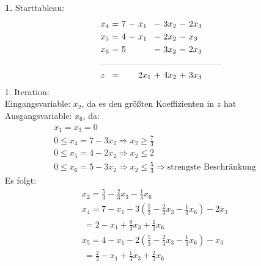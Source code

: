 \documentclass [a4paper,11pt]{article}
\author{\authorinfotitle}
\title{\titleinfo}
\date{\today}
\begin{document}
\maketitle
    \begin{enumerate}
        \item[\textbf{1.}]
            Starttableau:
            \begin{align*}
            \begin{alignedat}{6}
            & x_4 &\ = &\ 7 &\ - &\ x_1 &\ - &\ 3x_2 &\ - &\ 2x_3 \\
            & x_5 &\ = &\ 4 &\ - &\ x_1 &\ - &\ 2x_2 &\ - &\  x_3 \\
            & x_6 &\ = &\ 5 &    &      &\ - &\ 3x_2 &\ - &\ 2x_3 \\
            &\rlap{\rule{5cm}{.1pt}} &&&&&&&&\\
            & z   &\ = &    &    &\ 2x_1 &\ + &\  4x_2 &\ + &\ 3x_3 
            \end{alignedat}
            \end{align*}
            1. Iteration:\\
            Eingangsvariable: $x_2$, da es den größten Koeffizienten in $z$ hat\\
            Ausgangsvariable: $x_6$, da:
            \begin{align*}
                &x_1 = x_3 = 0\\
                & 0 \leq x_4 = 7 - 3x_2 \Rightarrow x_2 \geq \frac{7}{3}\\
                & 0 \leq x_5 = 4 - 2x_2 \Rightarrow x_2 \leq 2\\
                & 0 \leq x_6 = 5 - 3x_2 \Rightarrow x_2 \leq \frac{5}{3} \Rightarrow \text{strengste Beschränkung}
            \end{align*}
            Es folgt:
            \begin{align*}
                & x_2  = \frac{5}{3} - \frac{2}{3} x_3 -\frac{1}{3} x_6\\
                & x_4  = 7 - x_1 - 3\left( \frac{5}{3} - \frac{2}{3} x_3 -\frac{1}{3} x_6 \right) - 2x_3\\
                &    \ = 2 - x_1 + \frac{8}{3}x_3 + \frac{1}{3} x_6\\
                & x_5  = 4 - x_1 - 2\left( \frac{5}{3} - \frac{2}{3} x_3 -\frac{1}{3} x_6 \right) - x_3\\
                &    \ = \frac{2}{3} - x_1 + \frac{1}{3} x_3 + \frac{2}{3} x_6\\

\end{align*}
\end{enumerate}
\end{document}
